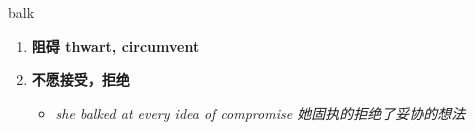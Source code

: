 
\begin{frame}
{\huge balk}
\begin{center}
\begin{enumerate}\Large
  \item \textbf{阻碍 thwart, circumvent}
  \item \textbf{不愿接受，拒绝}
  \begin{itemize}
    \item \em{\Large{she balked at every idea of compromise 她固执的拒绝了妥协的想法}}
  \end{itemize}
\end{enumerate}
\end{center}
\end{frame}
